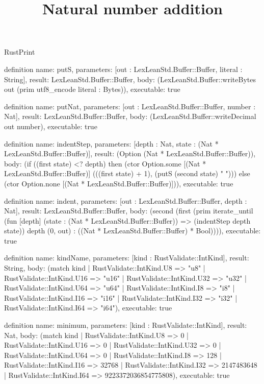 \begin{lexlean}{RustPrint}
\title{Natural number addition}
\begin{semanticmodule}
definition{
  name: putS,
  parameters: [out : LexLeanStd.Buffer::Buffer, literal : String],
  result: LexLeanStd.Buffer::Buffer,
  body: (LexLeanStd.Buffer::writeBytes out (prim utf8_encode literal : Bytes)),
  executable: true
}

definition{
  name: putNat,
  parameters: [out : LexLeanStd.Buffer::Buffer, number : Nat],
  result: LexLeanStd.Buffer::Buffer,
  body: (LexLeanStd.Buffer::writeDecimal out number),
  executable: true
}

definition{
  name: indentStep,
  parameters: [depth : Nat, state : (Nat * LexLeanStd.Buffer::Buffer)],
  result: (Option (Nat * LexLeanStd.Buffer::Buffer)),
  body: (if ((first state) <? depth) then (ctor Option.some [(Nat * LexLeanStd.Buffer::Buffer)] (((first state) + 1), (putS (second state) "    "))) else (ctor Option.none [(Nat * LexLeanStd.Buffer::Buffer)])),
  executable: true
}

definition{
  name: indent,
  parameters: [out : LexLeanStd.Buffer::Buffer, depth : Nat],
  result: LexLeanStd.Buffer::Buffer,
  body: (second (first (prim iterate_until (fun [depth] (state : (Nat * LexLeanStd.Buffer::Buffer)) => (indentStep depth state)) depth (0, out) : ((Nat * LexLeanStd.Buffer::Buffer) * Bool)))),
  executable: true
}

definition{
  name: kindName,
  parameters: [kind : RustValidate::IntKind],
  result: String,
  body: (match kind
    | RustValidate::IntKind.U8 => "u8"
    | RustValidate::IntKind.U16 => "u16"
    | RustValidate::IntKind.U32 => "u32"
    | RustValidate::IntKind.U64 => "u64"
    | RustValidate::IntKind.I8 => "i8"
    | RustValidate::IntKind.I16 => "i16"
    | RustValidate::IntKind.I32 => "i32"
    | RustValidate::IntKind.I64 => "i64"),
  executable: true
}

definition{
  name: minimum,
  parameters: [kind : RustValidate::IntKind],
  result: Nat,
  body: (match kind
    | RustValidate::IntKind.U8 => 0
    | RustValidate::IntKind.U16 => 0
    | RustValidate::IntKind.U32 => 0
    | RustValidate::IntKind.U64 => 0
    | RustValidate::IntKind.I8 => 128
    | RustValidate::IntKind.I16 => 32768
    | RustValidate::IntKind.I32 => 2147483648
    | RustValidate::IntKind.I64 => 9223372036854775808),
  executable: true
}


\end{semanticmodule}
\end{lexlean}
